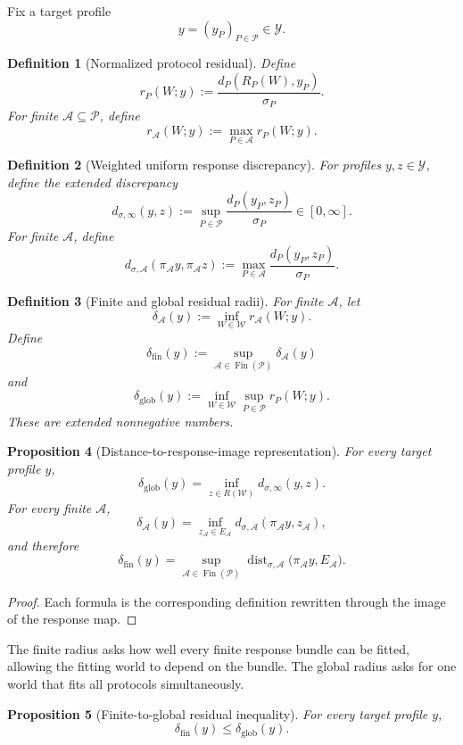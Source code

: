 \documentclass[11pt]{article}
\newtheorem{definition}{Definition}[section]
\newtheorem{proposition}[definition]{Proposition}
\newcommand{\W}{\mathcal W}
\newcommand{\Pcal}{\mathcal P}
\newcommand{\Acal}{\mathcal A}
\newcommand{\Y}{\mathcal Y}
\newcommand{\Fin}{\operatorname{Fin}}
\begin{document}
Fix a target profile
\[
y=(y_P)_{P\in\Pcal}\in\Y.
\]

\begin{definition}[Normalized protocol residual]
Define
\[
r_P(W;y)
:=
\frac{d_P(R_P(W),y_P)}{\sigma_P}.
\]
For finite $\Acal\subseteq\Pcal$, define
\[
r_{\Acal}(W;y)
:=
\max_{P\in\Acal}r_P(W;y).
\]
\end{definition}


\begin{definition}[Weighted uniform response discrepancy]
For profiles $y,z\in\Y$, define the extended discrepancy
\[
d_{\sigma,\infty}(y,z)
:=
\sup_{P\in\Pcal}
\frac{d_P(y_P,z_P)}{\sigma_P}
\in[0,\infty].
\]
For finite $\Acal$, define
\[
d_{\sigma,\Acal}
(\pi_{\Acal}y,\pi_{\Acal}z)
:=
\max_{P\in\Acal}
\frac{d_P(y_P,z_P)}{\sigma_P}.
\]
\end{definition}

\begin{definition}[Finite and global residual radii]
For finite $\Acal$, let
\[
\delta_{\Acal}(y)
:=
\inf_{W\in\W} r_{\Acal}(W;y).
\]
Define
\[
\delta_{\mathrm{fin}}(y)
:=
\sup_{\Acal\in\Fin(\Pcal)}
\delta_{\Acal}(y)
\]
and
\[
\delta_{\mathrm{glob}}(y)
:=
\inf_{W\in\W}
\sup_{P\in\Pcal}r_P(W;y).
\]
These are extended nonnegative numbers.
\end{definition}

\begin{proposition}[Distance-to-response-image representation]
For every target profile $y$,
\[
\delta_{\mathrm{glob}}(y)
=
\inf_{z\in R(\W)}d_{\sigma,\infty}(y,z).
\]
For every finite $\Acal$,
\[
\delta_{\Acal}(y)
=
\inf_{z_{\Acal}\in E_{\Acal}}
d_{\sigma,\Acal}
(\pi_{\Acal}y,z_{\Acal}),
\]
and therefore
\[
\delta_{\mathrm{fin}}(y)
=
\sup_{\Acal\in\Fin(\Pcal)}
\operatorname{dist}_{\sigma,\Acal}
\bigl(\pi_{\Acal}y,E_{\Acal}\bigr).
\]
\end{proposition}

\begin{proof}
Each formula is the corresponding definition rewritten through the image of
the response map.
\end{proof}

The finite radius asks how well every finite response bundle can be fitted,
allowing the fitting world to depend on the bundle. The global radius asks for
one world that fits all protocols simultaneously.

\begin{proposition}[Finite-to-global residual inequality]
For every target profile $y$,
\[
\delta_{\mathrm{fin}}(y)
\le
\delta_{\mathrm{glob}}(y).
\]
\end{proposition}
\end{document}
